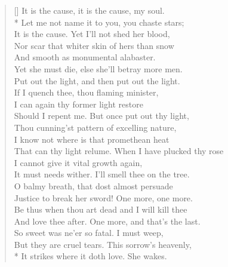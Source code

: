 \documentclass[MAIN]{subfiles}
\begin{document}
\settowidth{\versewidth}{That can thy light relume. When I have plucked thy rose}
\begin{verse}[\versewidth]
It is the cause, it is the cause, my soul.\\*
Let me not name it to you, you chaste stars;\\
It is the cause. Yet I'll not shed her blood,\\
Nor scar that whiter skin of hers than snow\\
And smooth as monumental alabaster.\\
Yet she must die, else she'll betray more men.\\
Put out the light, and then put out the light.\\
If I quench thee, thou flaming minister,\\
I can again thy former light restore\\
Should I repent me. But once put out thy light,\\
Thou cunning'st pattern of excelling nature,\\
I know not where is that promethean heat\\
That can thy light relume. When I have plucked thy rose\\
I cannot give it vital growth again,\\
It must needs wither. I'll smell thee on the tree.\\
O balmy breath, that dost almost persuade\\
Justice to break her sword! One more, one more.\\
Be thus when thou art dead and I will kill thee\\
And love thee after. One more, and that's the last.\\
So sweet was ne'er so fatal. I must weep,\\
But they are cruel tears. This sorrow's heavenly,\\*
It strikes where it doth love. She wakes.
\end{verse}
\end{document}
